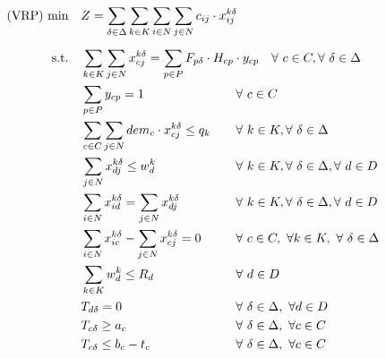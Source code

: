 \documentclass[preprint,review,12pt]{elsarticle}
\begin{document}
\begin{align}
	\text{(VRP) min} \quad      & Z = \sum\limits_{\delta\in \Delta} \sum\limits_{k\in K}\sum\limits_{i\in N}\sum\limits_{j\in N} c_{ij} \cdot x_{ij}^{k\delta}    && \label{PCVRP_FObj}    \\[5pt]
	\noindent \text{s.t.} \quad & \sum\limits_{k \in K}\sum\limits_{j \in N} x_{cj}^{k\delta} = \sum\limits_{p \in P} F_{p\delta} \cdot H_{cp} \cdot y_{cp}    && \text{\hspace{-0cm}} \forall \ c \in C, \forall \ \delta \in \Delta \label{PCVRP_Service} \\
	& \sum\limits_{p \in P} y_{cp} = 1                 && \text{\hspace{-1cm}} \forall \ c \in C  \label{PCVRP_Freq} \\
	& \sum\limits_{c \in C}\sum\limits_{j \in N}dem_{c} \cdot x_{cj}^{k\delta} \leq q_k                 && \text{\hspace{-1cm}} \forall \ k \in K, \forall \ \delta \in \Delta  \label{PCVRP_Capacity} \\
	& \sum\limits_{j \in N}x_{dj}^{k\delta} \leq w_d^k && \text{\hspace{-1cm}} \forall \ k \in K, \forall \ \delta \in \Delta, \forall \ d \in D \label{PCVRP_StartRoute} \\
	& \sum\limits_{i \in N}x_{id}^{k\delta} =    \sum\limits_{j \in N}x_{dj}^{k\delta} && \text{\hspace{-1cm}} \forall \ k \in K, \forall \ \delta \in \Delta, \forall \ d \in D \label{PCVRP_EndRoute} \\
	& \sum\limits_{i \in N}x_{ic}^{k\delta} - \sum\limits_{j \in N}x_{cj}^{k\delta} = 0             && \text{\hspace{-1cm}} \forall \ c \in C,\ \forall k \in K,\ \forall \ \delta \in \Delta \label{PCVRP_Balance} \\
	& \sum\limits_{k \in K}w_d^k \leq R_d                                     && \text{\hspace{-1cm}} \forall \ d \in D \label{PCVRP_CapacityD} \\
	& T_{d\delta} = 0  && \text{\hspace{-1cm}} \forall \ \delta \in \Delta, \ \forall d \in D \label{PCVRP_InitialT}\\
	& T_{c\delta} \geq a_c  && \text{\hspace{-1cm}} \forall \ \delta \in \Delta, \ \forall c \in C \label{PCVRP_ArriveT}\\
	& T_{c\delta} \leq b_c - t_c && \text{\hspace{-1cm}} \forall \ \delta \in \Delta, \ \forall c \in C \label{PCVRP_DepartT}
\end{align}
\end{document}
